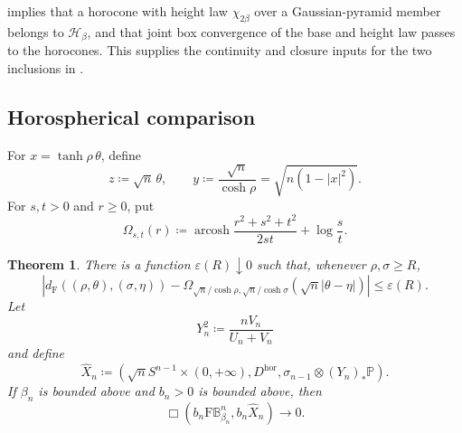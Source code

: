 \documentclass[10pt,a4paper]{amsart}
\numberwithin{equation}{section}
\newtheorem{theorem}{Theorem}[section]
\newcommand{\BetaBall}{\mathrm F\mathbb B^n_{\beta_n}}
\DeclareMathOperator{\arcosh}{arcosh}
\newcommand{\dF}{d_{\mathrm F}}
\newcommand{\eps}{\varepsilon}
\begin{document}
 implies that a horocone with height law $\chi_{2\beta}$ over a Gaussian-pyramid member belongs to $\mathcal H_\beta$, and that joint box convergence of the base and height law passes to the horocones.  This supplies the continuity and closure inputs for the two inclusions in .

\subsection{Horospherical comparison}

For $x=\tanh\rho\,\theta$, define
\begin{equation}\label{eq:horospherical-map} z\coloneqq\sqrt n\,\theta, \qquad y\coloneqq\frac{\sqrt n}{\cosh\rho} =\sqrt{n(1-|x|^2)}. \end{equation}
For $s,t>0$ and $r\ge0$, put
\begin{equation}\label{eq:upper-half-Funk} \Omega_{s,t}(r) \coloneqq\arcosh\frac{r^2+s^2+t^2}{2st}+\log\frac{s}{t}. \end{equation}

\begin{theorem}\label{thm:horospherical-transfer}
There is a function $\eps(R)\downarrow0$ such that, whenever $\rho,\sigma\ge R$,
\begin{equation}\label{eq:horospherical-error} \left|\dF((\rho,\theta),(\sigma,\eta)) -\Omega_{\sqrt n/\cosh\rho,\sqrt n/\cosh\sigma} (\sqrt n|\theta-\eta|)\right| \le\eps(R). \end{equation}
Let
\begin{equation}\label{eq:height-law} Y_n^2\coloneqq\frac{nV_n}{U_n+V_n} \end{equation}
and define
\begin{equation}\label{eq:upper-half-comparison-space} \widehat X_n \coloneqq\left(\sqrt nS^{n-1}\times(0,+\infty),D^{\mathrm{hor}}, \sigma_{n-1}\otimes (Y_n)_*\mathbb P\right). \end{equation}
If $\beta_n$ is bounded above and $b_n>0$ is bounded above, then
\begin{equation}\label{eq:horospherical-box-transfer} \Box(b_n\BetaBall,b_n\widehat X_n) \longrightarrow0. \end{equation}
\end{theorem}
\end{document}
